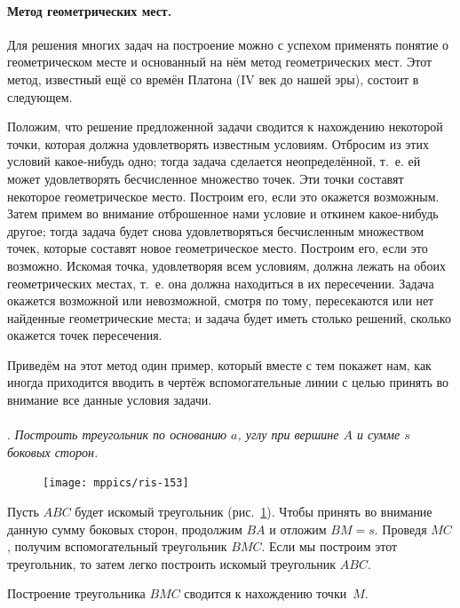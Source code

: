 \documentclass[oneside]{book}
\begin{document}
\paragraph{Метод геометрических мест.}\label{1938/133}
Для решения многих задач на построение можно с успехом применять понятие о геометрическом месте и основанный на нём метод геометрических мест.
Этот метод, известный ещё со времён Платона (IV век до нашей эры), состоит в следующем.

Положим, что решение предложенной задачи сводится к нахождению некоторой точки, которая должна удовлетворять известным условиям.
Отбросим из этих условий какое-нибудь одно;
тогда задача сделается неопределённой, т.~е. ей может удовлетворять бесчисленное множество точек.
Эти точки составят некоторое геометрическое место.
Построим его, если это окажется возможным.
Затем примем во внимание отброшенное нами условие и откинем какое-нибудь другое;
тогда задача будет снова удовлетворяться бесчисленным множеством точек, которые составят новое геометрическое место.
Построим его, если это возможно.
Искомая точка, удовлетворяя всем условиям, должна лежать на обоих геометрических местах, т.~е. она должна находиться в их пересечении.
Задача окажется возможной или невозможной, смотря по тому, пересекаются или нет найденные геометрические места;
и задача будет иметь столько решений, сколько окажется точек пересечения.

Приведём на этот метод один пример, который вместе с тем покажет нам, как иногда приходится вводить в чертёж вспомогательные линии с целью принять во внимание все данные условия задачи.

\paragraph{}\label{1938/134}
.
\emph{Построить треугольник по основанию $a$, углу при вершине $A$ и сумме $s$ боковых сторон.}


\begin{figure}
\centering
\texttt{[image: mppics/ris-153]}
\caption{}\label{1938/ris-153}
\end{figure}

Пусть $ABC$ будет искомый треугольник (рис.~\ref{1938/ris-153}).
Чтобы принять во внимание данную сумму боковых сторон, продолжим $BA$ и отложим $BM=s$.
Проведя $MC$, получим вспомогательный треугольник $BMC$.
Если мы построим этот треугольник, то затем легко построить искомый треугольник $ABC$.

Построение треугольника $BMC$ сводится к нахождению точки~$M$.
\end{document}
